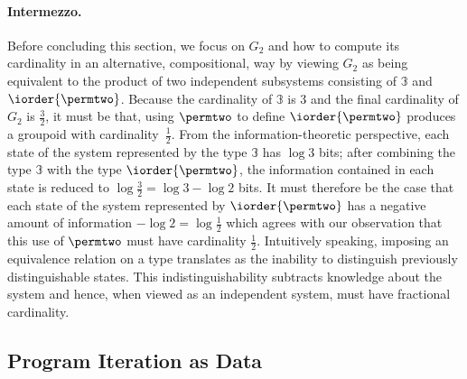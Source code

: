 \paragraph{Intermezzo.} Before concluding this section, we focus on
$G_2$ and how to compute its cardinality in an alternative,
compositional, way by viewing $G_2$ as being equivalent to the product
of two independent subsystems consisting of $\mathbb{3}$ and
$\iorder{\permtwo}$. Because the cardinality of $\mathbb{3}$ is 3 and the
final cardinality of $G_2$ is $\frac{3}{2}$, it must be that, using
$\permtwo$ to define $\iorder{\permtwo}$ produces a groupoid with
cardinality~$\frac{1}{2}$. From the information-theoretic perspective,
each state of the system represented by the type $\mathbb{3}$ has
$\log 3$ bits; after combining the type $\mathbb{3}$ with the type
$\iorder{\permtwo}$, the information contained in each state is reduced to
$\log \frac{3}{2} = \log 3 - \log 2$ bits. It must therefore be the case
that each state of the system represented by $\iorder{\permtwo}$ has a
negative amount of information $- \log 2 = \log \frac{1}{2}$ which
agrees with our observation that this use of $\permtwo$ must have cardinality
$\frac{1}{2}$. Intuitively speaking, imposing an equivalence relation on
a type translates as the inability to distinguish previously
distinguishable states. This indistinguishability subtracts knowledge
about the system and hence, when viewed as an independent system, must
have fractional cardinality.

\subsection{Program Iteration as Data}

